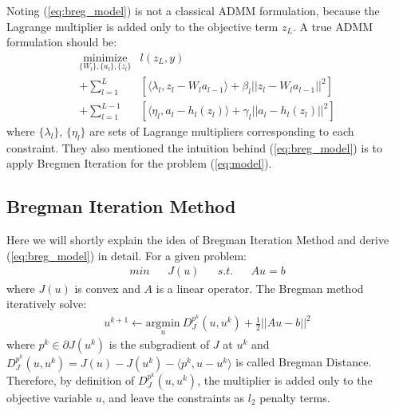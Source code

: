 \documentclass[letterpaper, 10 pt, conference]{ieeeconf}  %
\begin{document}
Noting (\ref{eq:breg_model}) is not a classical ADMM formulation, because the Lagrange multiplier is added only to the objective term $z_L$. A true ADMM formulation should be:
\begin{equation}
\begin{aligned}
\underset{\{W_l\},\{a_l\}, \{z_l\}}{\text{minimize}} & l(z_L,y) \\
+  \sum_{l=1}^{L}&[\langle \lambda_l, z_l - W_la_{l-1} \rangle + \beta_l||z_l - W_la_{l-1}||^2] \\
+ \sum_{l=1}^{L-1}&[\langle \eta_l, a_l - h_l(z_l) \rangle + \gamma_l||a_l - h_l(z_l)||^2 ]
\label{eq:admm_model}
\end{aligned}
\end{equation}
where $\{\lambda_l\}$, $\{\eta_l\}$ are sets of Lagrange multipliers corresponding to each constraint. They also mentioned the intuition behind (\ref{eq:breg_model}) is to apply Bregmen Iteration \cite{10} for the problem (\ref{eq:model}). 

\subsection{Bregman Iteration Method} \label{breg_method}
Here we will shortly explain the idea of Bregman Iteration Method and derive (\ref{eq:breg_model}) in detail. For a given problem: 
\begin{equation}
\begin{aligned}
min && J(u) && s.t. && Au=b 
\end{aligned}
\end{equation}
where  $J(u)$ is convex and $A$ is a linear operator. The Bregman method iteratively solve:
\begin{equation}
\begin{aligned}
u^{k+1} \leftarrow \underset{u}{\text{argmin}} \: D_J^{p^k}(u, u^k) + {\frac{1}{2}}||Au - b||^2
\label{eq:breg}
\end{aligned} 
\end{equation}
where $p^k \in \partial J(u^k)$ is the subgradient of $J$ at $u^k$ and $D_J^{p^k}(u, u^k) = J(u) - J(u^k) - \langle p^k, u - u^k\rangle $ is called Bregman Distance. Therefore, by definition of $D_J^{p^k}(u, u^k)$, the multiplier is added only to the objective variable $u$, and leave the constraints as $l_2$ penalty terms.
\end{document}
